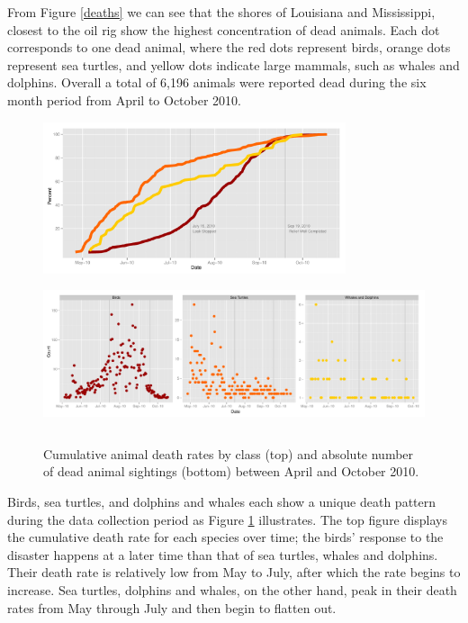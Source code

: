 \documentclass[authoryear,12pt]{elsarticle}
\begin{document}
{From Figure \ref{deaths} we can see that} the shores of Louisiana and Mississippi, closest to the oil rig show the highest concentration of dead animals. Each  {dot} corresponds to one dead  {animal, where} the red dots represent birds, orange dots  {represent} sea turtles, and yellow dots indicate large mammals, such as whales and dolphins. Overall a total of 6,196 animals were reported dead during  {the} six month period  {from April to October 2010}.

\begin{figure}[htbp] %
   \centering
   \includegraphics[height=1.75in]{death-rates.pdf} 
    \includegraphics[height=1.75in]{daily-death-counts.pdf}
   \caption{Cumulative animal death rates by class  (top) and absolute number of dead animal sightings (bottom) between April and October 2010.\newline}
   \label{death rates}
\end{figure}


Birds, sea turtles, and dolphins and whales  {each show a} unique death pattern during the data collection period as Figure \ref{death rates} illustrates. The  {top} figure  {displays the} cumulative death rate for each species over time; the {birds' response} to the disaster  happens at a {later} time than that of sea turtles, whales and dolphins.  {Their death rate is relatively low} from May to July, after which the rate beg{ins} to increase. Sea turtles, dolphins and whales, on the other hand, {peak in their} death rates from May  {through} July and  {then} begin to flatten out. \\
\end{document}
